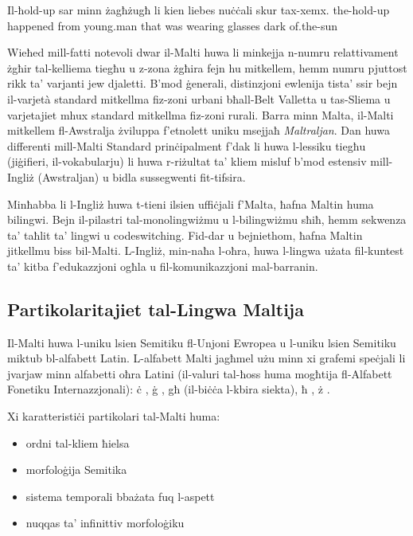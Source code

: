 \documentclass[]{../../metanetpaper}
\begin{document}
\begin{multicols}{2}
\begin{examples}
\item
\gll Il-ħold-up sar minn żagħżugħ li kien liebes nuċċali skur tax-xemx.
the-hold-up happened from young.man that was wearing glasses dark of.the-sun
\glend
\end{examples}

Wieħed mill-fatti notevoli dwar il-Malti huwa li minkejja n-numru relattivament żgħir tal-kelliema tiegħu u z-zona żgħira fejn hu mitkellem, hemm numru pjuttost rikk ta’ varjanti jew djaletti. B’mod ġenerali, distinzjoni ewlenija tista’ ssir bejn il-varjetà standard mitkellma fiz-zoni urbani bħall-Belt Valletta u tas-Sliema u varjetajiet mhux standard mitkellma fiz-zoni rurali. Barra minn Malta, il-Malti mitkellem fl-Awstralja żviluppa f’etnolett uniku msejjaħ \emph{Maltraljan}. Dan huwa differenti mill-Malti Standard prinċipalment f'dak li huwa l-lessiku tiegħu (jiġifieri, il-vokabularju) li huwa r-riżultat ta’ kliem misluf b’mod estensiv mill- Ingliż (Awstraljan) u bidla sussegwenti fit-tifsira. 

Minħabba li l-Ingliż huwa t-tieni ilsien uffiċjali f'Malta, ħafna Maltin huma bilingwi. Bejn il-pilastri tal-monolingwiżmu u l-bilingwiżmu sħiħ, hemm sekwenza ta’ taħlit ta’ lingwi u codeswitching. Fid-dar u bejniethom, ħafna Maltin jitkellmu biss bil-Malti. L-Ingliż, min-naħa l-oħra, huwa l-lingwa użata fil-kuntest ta’ kitba f’edukazzjoni ogħla u fil-komunikazzjoni mal-barranin.


\subsection{Partikolaritajiet tal-Lingwa Maltija}

Il-Malti huwa l-uniku lsien Semitiku fl-Unjoni Ewropea u l-uniku lsien Semitiku miktub bl-alfabett Latin. L-alfabett Malti jagħmel użu minn xi grafemi speċjali li jvarjaw minn alfabetti oħra Latini (il-valuri tal-ħoss huma mogħtija fl-Alfabett Fonetiku Internazzjonali): 
ċ , ġ , għ (il-biċċa l-kbira siekta), ħ , ż .

Xi karatteristiċi partikolari tal-Malti huma:

\begin{itemize}
\item ordni tal-kliem ħielsa  
\item morfoloġija Semitika
\item sistema temporali bbażata fuq l-aspett  
\item nuqqas ta’ infinittiv morfoloġiku
\end{itemize}


\end{multicols}
\end{document}
